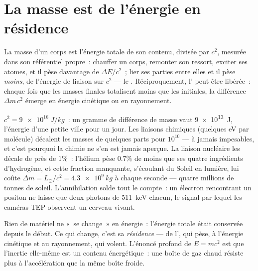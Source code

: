 \section{La masse est de l'énergie en résidence}

\begin{theorem}\label{thm:b3:relativistic-dynamics:emc2}
La masse d'un corps est l'énergie totale de son contenu, divisée par
$c^2$, mesurée dans son référentiel propre~: chauffer un corps,
remonter son ressort, exciter ses atomes, et il pèse davantage de
$\Delta E/c^2$~; lier ses parties entre elles et il pèse \emph{moins},
de l'énergie de liaison sur $c^2$ --- le \emph{}.
Réciproquement, l' peut être libérée~: chaque fois que
les masses finales totalisent moins que les initiales, la différence
$\Delta m\,c^2$ émerge en énergie cinétique ou en rayonnement.
\end{theorem}
\admitted

\begin{example}\label{ex:b3:relativistic-dynamics:ledger}
$c^2 = \qty{9e16}{J/kg}$~: un gramme de différence de masse vaut
\qty{9e13}{J}, l'énergie d'une petite ville pour un jour. Les liaisons
chimiques (quelques eV par molécule) décalent les masses de quelques
parts pour $10^{10}$ --- à jamais impesables, et c'est pourquoi la
chimie ne s'en est jamais aperçue. La liaison nucléaire les décale de
près de $1\%$~: l'hélium pèse $0.7\%$ de moins que ses quatre
ingrédients d'hydrogène, et cette fraction manquante, s'écoulant du
Soleil en lumière, lui coûte $\Delta m = L_\odot/c^2 =
\qty{4.3e9}{kg}$ à chaque seconde --- quatre millions de tonnes de
soleil. L'annihilation solde tout le compte~: un électron rencontrant
un positon ne laisse que deux photons de \qty{511}{keV} chacun, le
signal par lequel les caméras TEP observent un cerveau vivant.
\end{example}

\begin{remark}\label{rem:b3:relativistic-dynamics:conversion}
Rien de matériel ne «~se change~» en énergie~: l'énergie totale était
conservée depuis le début. Ce qui change, c'est sa \emph{résidence}
--- de l', qui pèse, à l'énergie cinétique et au
rayonnement, qui volent. L'énoncé profond de $E = mc^2$ est que
l'inertie elle-même est un contenu énergétique~: une boîte de gaz
chaud résiste plus à l'accélération que la même boîte froide.
\end{remark}

